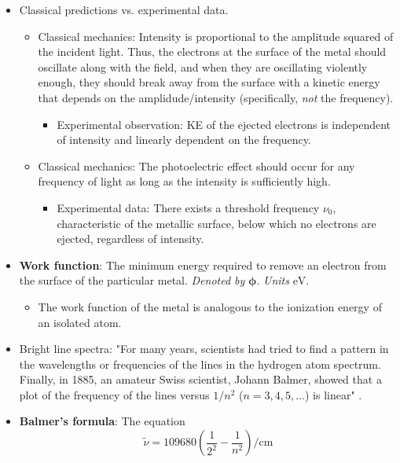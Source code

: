 \documentclass[../notes.tex]{subfiles}
\begin{document}
\begin{itemize}
    \item Classical predictions vs. experimental data.
    \begin{itemize}
        \item Classical mechanics: Intensity is proportional to the amplitude squared of the incident light. Thus, the electrons at the surface of the metal should oscillate along with the field, and when they are oscillating violently enough, they should break away from the surface with a kinetic energy that depends on the amplidude/intensity (specifically, \emph{not} the frequency).
        \begin{itemize}
            \item Experimental observation: KE of the ejected electrons is independent of intensity and linearly dependent on the frequency.
        \end{itemize}
        \item Classical mechanics: The photoelectric effect should occur for any frequency of light as long as the intensity is sufficiently high.
        \begin{itemize}
            \item Experimental data: There exists a threshold frequency $\nu_0$, characteristic of the metallic surface, below which no electrons are ejected, regardless of intensity.
        \end{itemize}
    \end{itemize}
    \item \textbf{Work function}: The minimum energy required to remove an electron from the surface of the particular metal. \emph{Denoted by} $\bm{\phi}$. \emph{Units} $\si{\electronvolt}$.
    \begin{itemize}
        \item The work function of the metal is analogous to the ionization energy of an isolated atom.
    \end{itemize}
    \item Bright line spectra: "For many years, scientists had tried to find a pattern in the wavelengths or frequencies of the lines in the hydrogen atom spectrum. Finally, in 1885, an amateur Swiss scientist, Johann Balmer, showed that a plot of the frequency of the lines versus $1/n^2$ ($n=3,4,5,\dots$) is linear" \parencite[10]{bib:McQuarrieSimon}.
    \item \textbf{Balmer's formula}: The equation
    \begin{equation*}
        \tilde{\nu} = \num{109680}\left( \frac{1}{2^2}-\frac{1}{n^2} \right)\si{\per\centi\meter}

\end{equation*}
\end{itemize}
\end{document}
